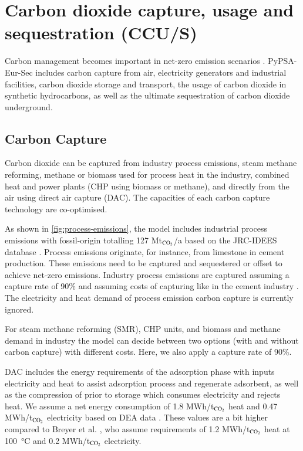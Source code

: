 \section{Carbon dioxide capture, usage and sequestration (CCU/S)}
\label{sec:si:carbon-management}

Carbon management becomes important in net-zero \co emission scenarios
. PyPSA-Eur-Sec includes carbon capture
from air, electricity generators and industrial facilities, carbon dioxide
storage and transport, the usage of carbon dioxide in synthetic hydrocarbons, as
well as the ultimate sequestration of carbon dioxide underground.

\subsection{Carbon Capture}

Carbon dioxide can be captured from industry process emissions, steam methane
reforming, methane or biomass used for process heat in the industry, combined
heat and power plants (CHP using biomass or methane), and directly from the air
using direct air capture (DAC). The capacities of each carbon capture technology
are co-optimised.

As shown in \cref{fig:process-emissions}, the model includes industrial process
emissions with fossil-origin totalling 127 Mt$_{\ce{CO2}}$/a based on
the JRC-IDEES database . Process emissions originate, for instance,
from limestone in cement production. These emissions need to be captured and
sequestered or offset to achieve net-zero emissions. Industry process emissions
are captured assuming a capture rate of 90\% and assuming costs of \co capturing
like in the cement industry . The electricity and heat demand of process
emission carbon capture is currently ignored.

For steam methane reforming (SMR), CHP units, and biomass and methane demand in
industry the model can decide between two options (with and without carbon
capture) with different costs. Here, we also apply a capture rate of 90\%.

DAC includes the energy requirements of the adsorption phase with inputs
electricity and heat to assist adsorption process and regenerate adsorbent, as
well as the compression of \co prior to storage which consumes electricity and
rejects heat. We assume a net energy consumption of 1.8 MWh/t$_{\ce{CO2}}$ heat and 0.47
MWh/t$_{\ce{CO2}}$ electricity based on DEA data . These values are a bit higher
compared to Breyer et al. , who assume
requirements of 1.2 MWh/t$_{\ce{CO2}}$ heat at \SI{100}{\celsius} and 0.2 MWh\el/t$_{\ce{CO2}}$
electricity.

